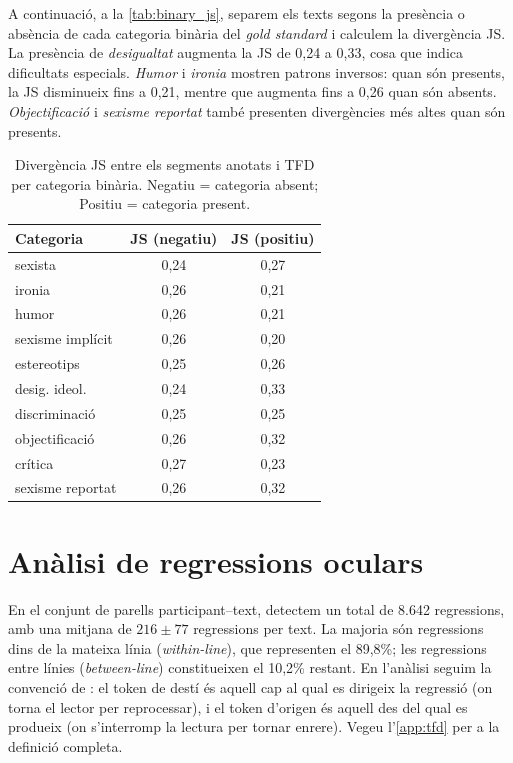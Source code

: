 A continuació, a la \autoref{tab:binary_js}, separem els texts segons la presència o absència de cada categoria binària del \textit{gold standard} i calculem la divergència JS.
La presència de \textit{desigualtat} augmenta la JS de 0,24 a 0,33, cosa que indica dificultats especials.
\textit{Humor} i \textit{ironia} mostren patrons inversos: quan són presents, la JS disminueix fins a 0,21, mentre que augmenta fins a 0,26 quan són absents. \textit{Objectificació} i \textit{sexisme reportat} també presenten divergències més altes quan són presents.

\iftables
\begin{table}[htbp]
\small
\centering
\begin{tabular}{lcc}
\toprule
\textbf{Categoria} & \textbf{JS (negatiu)} & \textbf{JS (positiu)} \\
\midrule
sexista          & 0,24 & 0,27 \\
ironia           & 0,26 & 0,21 \\
humor            & 0,26 & 0,21 \\
sexisme implícit & 0,26 & 0,20 \\
estereotips      & 0,25 & 0,26 \\
desig. ideol.    & 0,24 & 0,33 \\
discriminació    & 0,25 & 0,25 \\
objectificació   & 0,26 & 0,32 \\
crítica          & 0,27 & 0,23 \\
sexisme reportat & 0,26 & 0,32 \\
\bottomrule
\end{tabular}
\caption{Divergència JS entre els segments anotats i TFD per categoria binària. Negatiu = categoria absent; Positiu = categoria present.}
\label{tab:binary_js}
\end{table}
\fi


\section{Anàlisi de regressions oculars}


En el conjunt de parells participant--text, detectem un total de 8.642 regressions, amb una mitjana de $216 \pm 77$ regressions per text.
La majoria són regressions dins de la mateixa línia (\textit{within-line}), que representen el 89,8\%; les regressions entre línies (\textit{between-line}) constitueixen el 10,2\% restant.
En l'anàlisi seguim la convenció de \textcite{rayner2009eye}: el token de destí és aquell cap al qual es dirigeix la regressió (on torna el lector per reprocessar), i el token d'origen és aquell des del qual es produeix (on s'interromp la lectura per tornar enrere). Vegeu l'\autoref{app:tfd} per a la definició completa.

